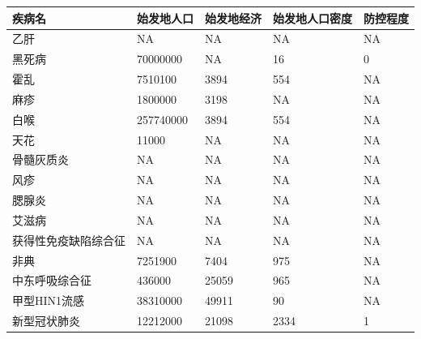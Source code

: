 \documentclass[a4paper, 11pt,twoside=true,UTF8]{scrartcl}
\begin{document}
\begin{table}[H]
	\begin{tabular}{lllll}
		\hline
		\textbf{疾病名} & \textbf{始发地人口} & \textbf{始发地经济} & \textbf{始发地人口密度} & \textbf{防控程度} \\ \hline
		乙肝           & NA             & NA             & NA               & NA            \\
		黑死病          & 70000000       & NA             & 16               & 0             \\
		霍乱           & 7510100        & 3894           & 554              & NA            \\
		麻疹           & 1800000        & 3198           & NA               & NA            \\
		白喉           & 257740000      & 3894           & 554              & NA            \\
		天花           & 11000          & NA             & NA               & NA            \\
		骨髓灰质炎        & NA             & NA             & NA               & NA            \\
		风疹           & NA             & NA             & NA               & NA            \\
		腮腺炎          & NA             & NA             & NA               & NA            \\
		艾滋病          & NA             & NA             & NA               & NA            \\
		获得性免疫缺陷综合征   & NA             & NA             & NA               & NA            \\
		非典           & 7251900        & 7404           & 975              & NA            \\
		中东呼吸综合征      & 436000         & 25059          & 965              & NA            \\
		甲型HIN1流感     & 38310000       & 49911          & 90               & NA            \\
		新型冠状肺炎       & 12212000       & 21098          & 2334             & 1             \\ \hline
	\end{tabular}
\end{table}

\newpage
\end{document}
